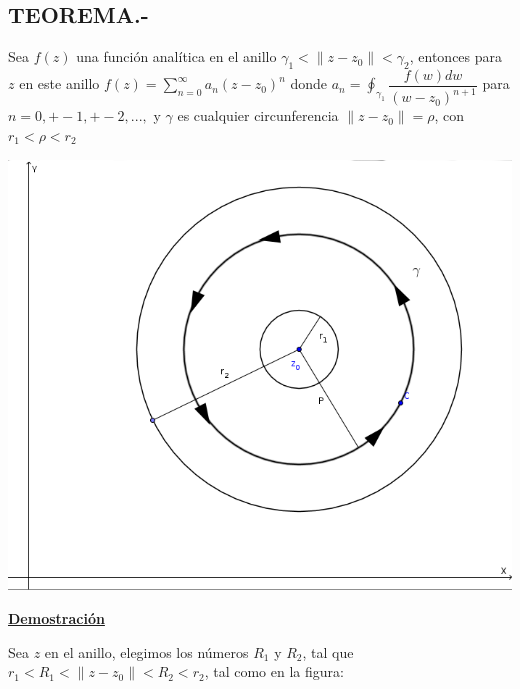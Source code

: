 \documentclass[10pt,a4paper]{article}
\begin{document}
\subsection{TEOREMA.-}
Sea $f(z)$ una función analítica en el anillo $\displaystyle{\gamma_1 < \parallel z - z_0 \parallel < \gamma_2}$, entonces para $z$ en este anillo $\displaystyle{f(z) = \sum_{n = 0}^{\infty} a_n (z-z_0)^n}$ donde $\displaystyle{a_n = \oint_{\gamma_1} \dfrac{f(w) dw}{(w-z_0)^{n+1}}}$ para $\displaystyle{n = 0, +- 1, +-2,...,}$ y $\gamma$ es cualquier circunferencia $\parallel  z - z_0 \parallel = \rho$, con $r_1 < \rho < r_2$\\
\begin{center}
\includegraphics[scale=0.25]{5.png}
\end{center}
 \begin{center}
  \textbf{\underline{Demostración}}
  \end{center} 
Sea $z$ en el anillo, elegimos los números $R_1$ y $R_2$, tal que $\displaystyle{r_1 < R_1 <  \parallel z -z_0  \parallel < R_2 < r_2}$, tal como en la figura: \\
\end{document}
